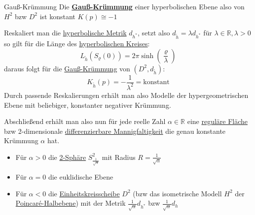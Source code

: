 \begin{titleDef}{Gauß-Krümmung}
\label{gausskruemmungEinheitskreis}
Die \hyperref[gausskruemmung]{\textbf{Gauß-Krümmung}} einer hyperbolischen Ebene also von $H^2$ bzw $D^2$ ist konstant $K(p)\cong-1$\par
Reskaliert man die \hyperref[hyperToMetrisch]{hyperbolische Metrik} $d_{h^*}$, setzt also $d_{\tilde{h}}=\lambda d_{h^*}$ für $\lambda\in\mathbb{R}, \lambda>0$ so gilt für die Länge des \hyperref[hyperKreis]{hyperbolischen Kreises}:
$$L_{\tilde{h}}(S_\varrho(0))=2\pi\sinh(\frac{\varrho}{\lambda})$$
daraus folgt für die \hyperref[gausskruemmung]{Gauß-Krümmung} von $(D^2,d_{\tilde{h}})$:
$$K_{\tilde{h}}(p)=-\frac{1}{\lambda^2}=\text{konstant}$$
Durch passende Reskalierungen erhält man also Modelle der hypergeometrischen Ebene mit beliebiger, konstanter negativer Krümmung.\par
Abschließend erhält man also nun für jede reelle Zahl $\alpha\in\mathbb{R}$ eine \hyperref[regFlaeche]{reguläre Fläche} bzw 2-dimensionale \hyperref[diffMannigfaltigkeit]{differenzierbare Mannigfaltigkeit} die genau konstante Krümmung $\alpha$ hat.
\begin{itemize}
	\item Für $\alpha>0$ die \hyperref[ndimsphere]{2-Sphäre} $S_{\frac{1}{\sqrt{\alpha}}}^2$ mit Radius $R=\frac{1}{\sqrt{\alpha}}$
	\item Für $\alpha=0$ die euklidische Ebene
	\item Für $\alpha<0$ die \hyperref[hyperEinheitskreis]{Einheitskreisscheibe} $D^2$ (bzw das isometrische Modell $H^2$ der \hyperref[hyperbolischpoincare]{Poincaré-Halbebene}) mit der Metrik $\frac{1}{\sqrt{\alpha}}d_{h^*}$ bzw $\frac{1}{\sqrt{\alpha}}d_{h}$
\end{itemize}
\end{titleDef}